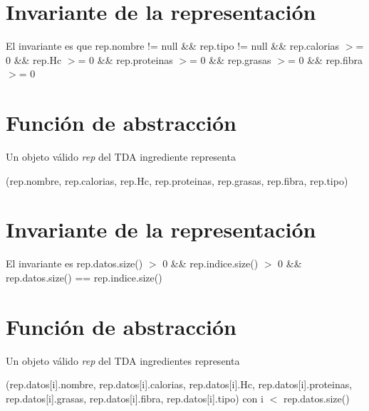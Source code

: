 \hypertarget{repColeccion_invColeccion}{}\section{Invariante de la representación}\label{repColeccion_invColeccion}
El invariante es que rep.\+nombre != null \&\& rep.\+tipo != null \&\& rep.\+calorias $>$= 0 \&\& rep.\+Hc $>$= 0 \&\& rep.\+proteinas $>$= 0 \&\& rep.\+grasas $>$= 0 \&\& rep.\+fibra $>$= 0\hypertarget{repColeccion_faColeccion}{}\section{Función de abstracción}\label{repColeccion_faColeccion}
Un objeto válido {\itshape rep} del T\+DA ingrediente representa

(rep.\+nombre, rep.\+calorias, rep.\+Hc, rep.\+proteinas, rep.\+grasas, rep.\+fibra, rep.\+tipo)\hypertarget{repColeccion_invColeccion}{}\section{Invariante de la representación}\label{repColeccion_invColeccion}
El invariante es rep.\+datos.\+size() $>$ 0 \&\& rep.\+indice.\+size() $>$ 0 \&\& rep.\+datos.\+size() == rep.\+indice.\+size()\hypertarget{repColeccion_faColeccion}{}\section{Función de abstracción}\label{repColeccion_faColeccion}
Un objeto válido {\itshape rep} del T\+DA ingredientes representa

(rep.\+datos\mbox{[}i\mbox{]}.nombre, rep.\+datos\mbox{[}i\mbox{]}.calorias, rep.\+datos\mbox{[}i\mbox{]}.Hc, rep.\+datos\mbox{[}i\mbox{]}.proteinas, rep.\+datos\mbox{[}i\mbox{]}.grasas, rep.\+datos\mbox{[}i\mbox{]}.fibra, rep.\+datos\mbox{[}i\mbox{]}.tipo) con i $<$ rep.\+datos.\+size() 